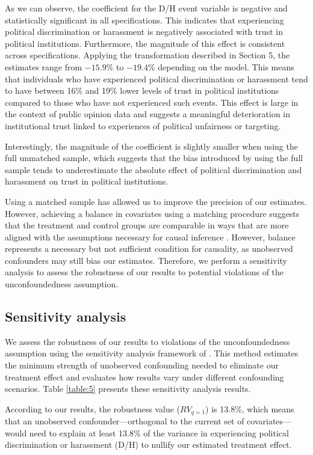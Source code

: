 \documentclass{article}
\begin{document}
As we can observe, the coefficient for the D/H event variable is negative and statistically significant in all specifications. This indicates that experiencing political discrimination or harassment is negatively associated with trust in political institutions. Furthermore, the magnitude of this effect is consistent across specifications. Applying the transformation described in Section 5, the estimates range from $-15.9\%$ to $-19.4\%$ depending on the model. This means that individuals who have experienced political discrimination or harassment tend to have between 16\% and 19\% lower levels of trust in political institutions compared to those who have not experienced such events. This effect is large in the context of public opinion data and suggests a meaningful deterioration in institutional trust linked to experiences of political unfairness or targeting.

Interestingly, the magnitude of the coefficient is slightly smaller when using the full unmatched sample, which suggests that the bias introduced by using the full sample tends to underestimate the absolute effect of political discrimination and harassment on trust in political institutions.

Using a matched sample has allowed us to improve the precision of our estimates. However, achieving a balance in covariates using a matching procedure suggests that the treatment and control groups are comparable in ways that are more aligned with the assumptions necessary for causal inference \parencite{branson_randomization_2021}. However, balance represents a necessary but not sufficient condition for causality, as unobserved confounders may still bias our estimates. Therefore, we perform a sensitivity analysis to assess the robustness of our results to potential violations of the unconfoundedness assumption.

\subsection{Sensitivity analysis}

We assess the robustness of our results to violations of the unconfoundedness assumption using the sensitivity analysis framework of \textcite{cinelli_making_2020}. This method estimates the minimum strength of unobserved confounding needed to eliminate our treatment effect and evaluates how results vary under different confounding scenarios. Table \ref{table:5} presents these sensitivity analysis results.

According to our results, the robustness value ($RV_{q = 1}$) is 13.8\%, which means that an unobserved confounder—orthogonal to the current set of covariates—would need to explain at least 13.8\% of the variance in experiencing political discrimination or harassment (D/H) to nullify our estimated treatment effect.
\end{document}
